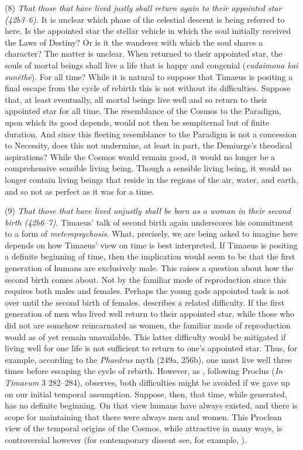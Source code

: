 (8) \emph{That those that have lived justly shall return again to their appointed star (42b3--6).} It is unclear which phase of the celestial descent is being referred to here. Is the appointed star the stellar vehicle in which the soul initially received the Laws of Destiny? Or is it the wanderer with which the soul shares a character? The matter is unclear. When returned to their appointed star, the souls of mortal beings shall live a life that is happy and congenial (\emph{eudaimona kai sunēthē}). For all time? While it is natural to suppose that Timaeus is positing a final escape from the cycle of rebirth this is not without its difficulties. Suppose that, at least eventually, all mortal beings live well and so return to their appointed star for all time. The resemblance of the Cosmos to the Paradigm, upon which its good depends, would not then be sempiternal but of finite duration. And since this fleeting resemblance to the Paradigm is not a concession to Necessity, does this not undermine, at least in part, the Demiurge's theodical aspirations? While the Cosmos would remain good, it would no longer be a comprehensive sensible living being. Though a sensible living being, it would no longer contain living beings that reside in the regions of the air, water, and earth, and so not as perfect as it was for a time.

(9) \emph{That those that have lived unjustly shall be born as a woman in their second birth (42b6--7).} Timaeus' talk of second birth again underscores his commitment to a form of \emph{metempsychosis}. What, precisely, we are being asked to imagine here depends on how Timaeus' view on time is best interpreted. If Timaeus is positing a definite beginning of time, then the implication would seem to be that the first generation of humans are exclusively male. This raises a question about how the second birth comes about. Not by the familiar mode of reproduction since this requires both males and females. Perhaps the young gods appointed task is not over until the second birth of females. \citet[261]{Taylor:1928qb} describes a related difficulty. If the first generation of men who lived well return to their appointed star, while those who did not are somehow reincarnated as women, the familiar mode of reproduction would as of yet remain unavailable. This latter difficulty would be mitigated if living well for one life is not sufficient to return to one's appointed star. Thus, for example, according to the \emph{Phaedrus} myth (249a, 256b), one must live well three times before escaping the cycle of rebirth. However, as \citet[145--6]{Cornford:1935fk}, following Proclus (\emph{In Timaeum} 3 282--284), observes, both difficulties might be avoided if we gave up on our initial temporal assumption. Suppose, then, that time, while generated, has no definite beginning. On that view humans have always existed, and there is scope for maintaining that there were always men and women. This Proclean view of the temporal origins of the Cosmos, while attractive in many ways, is controversial however (for contemporary dissent see, for example, \citealt[chapter 2]{Mohr:2005xe}).

